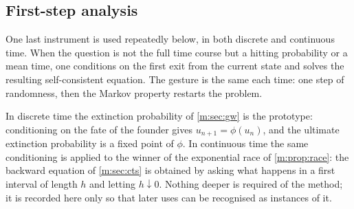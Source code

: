 \subsection{First-step analysis}
\label{m:sec:firststep}

One last instrument is used repeatedly below, in both discrete and continuous
time. When the question is not the full time course but a hitting probability or a
mean time, one conditions on the first exit from the current state and solves the
resulting self-consistent equation. The gesture is the same each time: one step of
randomness, then the Markov property restarts the problem.

In discrete time the extinction probability of \cref{m:sec:gw} is the prototype:
conditioning on the fate of the founder gives $u_{n+1}=\phi(u_n)$, and the ultimate
extinction probability is a fixed point of $\phi$. In continuous time the same
conditioning is applied to the winner of the exponential race of
\cref{m:prop:race}: the backward equation of \cref{m:sec:cts} is obtained by asking
what happens in a first interval of length $h$ and letting $h\downarrow0$. Nothing
deeper is required of the method; it is recorded here only so that later uses can
be recognised as instances of it.
